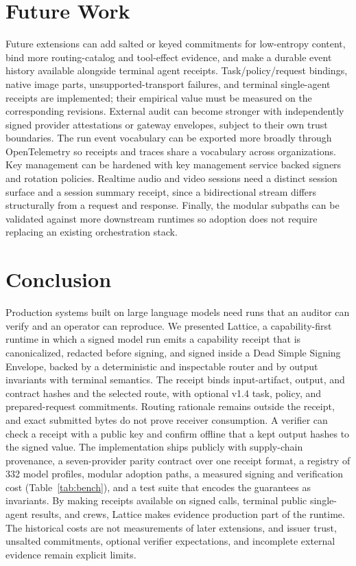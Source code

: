 \documentclass[conference]{IEEEtran}
\begin{document}
\section{Future Work}

Future extensions can add salted or keyed commitments for low-entropy content,
bind more routing-catalog and tool-effect evidence, and make a durable event history
available alongside terminal agent receipts. Task/policy/request bindings, native
image parts, unsupported-transport failures, and terminal single-agent receipts are
implemented; their empirical value must be measured on the corresponding revisions.
External audit can become stronger with independently signed provider attestations or
gateway envelopes, subject to their own trust boundaries.
The run event vocabulary can be exported more broadly through OpenTelemetry
\cite{opentelemetry} so receipts and traces share a vocabulary across organizations.
Key management can be hardened with key management service backed signers and rotation
policies. Realtime audio and video sessions need a distinct session surface and a
session summary receipt, since a bidirectional stream differs structurally from a
request and response. Finally, the modular subpaths can be validated against more
downstream runtimes so adoption does not require replacing an existing orchestration
stack.

\section{Conclusion}

Production systems built on large language models need runs that an auditor can verify
and an operator can reproduce. We presented Lattice, a capability-first runtime in which
a signed model run emits a capability receipt that is canonicalized, redacted before
signing, and signed inside a Dead Simple Signing Envelope, backed by a deterministic and
inspectable router and by output invariants with terminal semantics. The receipt binds
input-artifact, output, and contract hashes and the selected route, with optional
v1.4 task, policy, and prepared-request commitments. Routing rationale remains outside
the receipt, and exact submitted bytes do not prove receiver consumption. A verifier can
check a receipt with a public key and confirm offline that a kept output hashes to the
signed value. The implementation ships publicly with supply-chain provenance, a
seven-provider parity contract over one receipt format, a registry of 332 model profiles,
modular adoption paths, a measured signing and verification cost
(Table~\ref{tab:bench}), and a test suite that encodes the guarantees as invariants. By
making receipts available on signed calls, terminal public single-agent results, and
crews, Lattice makes evidence production part of the runtime. The historical costs are
not measurements of later extensions, and issuer trust, unsalted commitments,
optional verifier expectations, and incomplete external evidence remain explicit limits.
\end{document}
